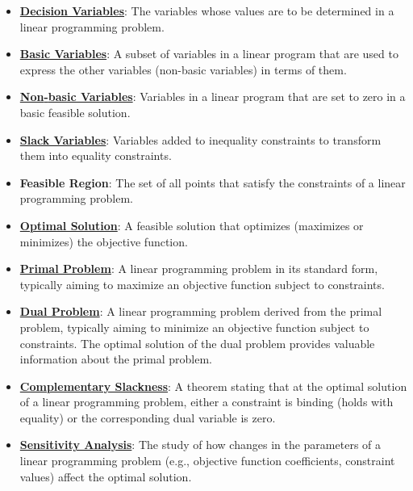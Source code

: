 \documentclass{article}%
\begin{document}
\begin{itemize}[leftmargin=*]
\item \href{https://www.math.purdue.edu/~yipn/421/2024-10-01-DualGeneralLP.pdf#page=1}{\textbf{Decision Variables}}: The variables whose values are to be determined in a linear programming problem. %
\item \href{https://www.math.purdue.edu/~yipn/421/2024-10-01-DualGeneralLP.pdf#page=2}{\textbf{Basic Variables}}: A subset of variables in a linear program that are used to express the other variables (non-basic variables) in terms of them. %
\item \href{https://www.math.purdue.edu/~yipn/421/2024-10-01-DualGeneralLP.pdf#page=2}{\textbf{Non{-}basic Variables}}: Variables in a linear program that are set to zero in a basic feasible solution. %
\item \href{https://www.math.purdue.edu/~yipn/421/2024-10-01-DualGeneralLP.pdf#page=2}{\textbf{Slack Variables}}: Variables added to inequality constraints to transform them into equality constraints. %
\item \textbf{Feasible Region}: The set of all points that satisfy the constraints of a linear programming problem.%
\item \href{https://www.math.purdue.edu/~yipn/421/2024-10-01-DualGeneralLP.pdf#page=2}{\textbf{Optimal Solution}}: A feasible solution that optimizes (maximizes or minimizes) the objective function. %
\item \href{https://www.math.purdue.edu/~yipn/421/2024-10-01-SensitivityDuality.pdf#page=1}{\textbf{Primal Problem}}: A linear programming problem in its standard form, typically aiming to maximize an objective function subject to constraints. %
\item \href{https://www.math.purdue.edu/~yipn/421/2024-10-01-SensitivityDuality.pdf#page=2}{\textbf{Dual Problem}}: A linear programming problem derived from the primal problem, typically aiming to minimize an objective function subject to constraints. The optimal solution of the dual problem provides valuable information about the primal problem. %
\item \href{https://www.math.purdue.edu/~yipn/421/2024-10-01-SensitivityDuality.pdf#page=3}{\textbf{Complementary Slackness}}: A theorem stating that at the optimal solution of a linear programming problem, either a constraint is binding (holds with equality) or the corresponding dual variable is zero. %
\item \href{https://www.math.purdue.edu/~yipn/421/2024-10-01-SensitivityDuality.pdf#page=1}{\textbf{Sensitivity Analysis}}: The study of how changes in the parameters of a linear programming problem (e.g., objective function coefficients, constraint values) affect the optimal solution. %

\end{itemize}
\end{document}
